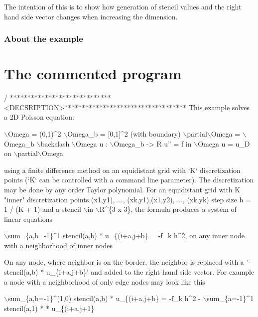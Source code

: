 {\ttfamily The intention of this is to show how generation of stencil values and the right hand side vector changes when increasing the dimension.}

{\ttfamily \label{_Abouttheexample}%
\subsubsection*{About the example }}

{\ttfamily }

{\ttfamily  \label{_CommProg}%
 \section*{The commented program}}

{\ttfamily }

{\ttfamily 
\begin{DoxyCode}
/ *****************************<DECSRIPTION>***********************************
This example solves a 2D Poisson equation:

    \(\backslash\)Omega = (0,1)^2
    \(\backslash\)Omega\_b = [0,1]^2   (with boundary)
    \(\backslash\)partial\(\backslash\)Omega = \(\backslash\)Omega\_b \(\backslash\)backslash \(\backslash\)Omega
    u : \(\backslash\)Omega\_b -> R
    u\textcolor{stringliteral}{''} = f in \(\backslash\)Omega
    u = u\_D on \(\backslash\)partial\(\backslash\)Omega

\textcolor{keyword}{using} a finite difference method on an equidistant grid with `K` discretization
points (`K` can be controlled with a command line parameter). The discretization
may be done by any order Taylor polynomial.
For an equidistant grid with K \textcolor{stringliteral}{"inner"} discretization points (x1,y1), ...,
(xk,y1),(x1,y2), ..., (xk,yk) step size h = 1 / (K + 1) and a stencil \(\backslash\)in
\(\backslash\)R^\{3 x 3\}, the formula produces a system of linear equations

\(\backslash\)sum\_\{a,b=-1\}^1 stencil(a,b) * u\_\{(i+a,j+b\} = -f\_k h^2,  on any inner node with
a neighborhood of inner nodes

On any node, where neighbor is on the border, the neighbor is replaced with a
\textcolor{stringliteral}{'-stencil(a,b) * u\_\{i+a,j+b\}'} and added to the right hand side vector. For
example a node with a neighborhood of only edge nodes may look like this

\(\backslash\)sum\_\{a,b=-1\}^(1,0) stencil(a,b) * u\_\{(i+a,j+b\} = -f\_k h^2 - \(\backslash\)sum\_\{a=-1\}^1
stencil(a,1) * * u\_\{(i+a,j+1\}


\end{DoxyCode}}
